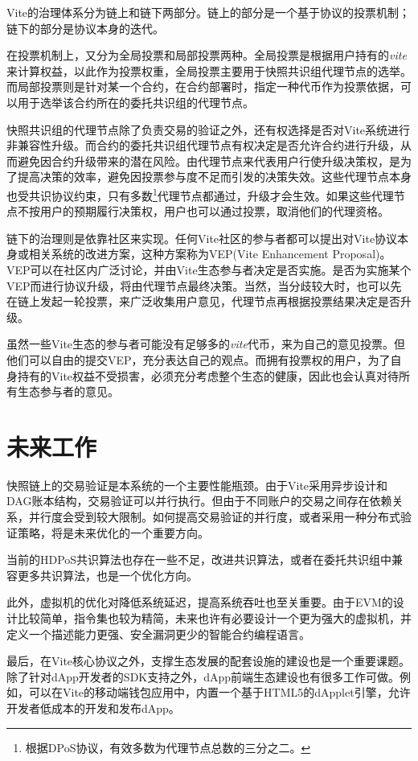 \documentclass[UTF8,nofonts]{ctexart}
\begin{document}
\begin{multicols}{2}
Vite的治理体系分为链上和链下两部分。链上的部分是一个基于协议的投票机制；链下的部分是协议本身的迭代。

在投票机制上，又分为全局投票和局部投票两种。全局投票是根据用户持有的\textit{vite}来计算权益，以此作为投票权重，全局投票主要用于快照共识组代理节点的选举。而局部投票则是针对某一个合约，在合约部署时，指定一种代币作为投票依据，可以用于选举该合约所在的委托共识组的代理节点。

快照共识组的代理节点除了负责交易的验证之外，还有权选择是否对Vite系统进行非兼容性升级。而合约的委托共识组代理节点有权决定是否允许合约进行升级，从而避免因合约升级带来的潜在风险。由代理节点来代表用户行使升级决策权，是为了提高决策的效率，避免因投票参与度不足而引发的决策失效。这些代理节点本身也受共识协议约束，只有多数\footnote{根据DPoS协议，有效多数为代理节点总数的三分之二。}代理节点都通过，升级才会生效。如果这些代理节点不按用户的预期履行决策权，用户也可以通过投票，取消他们的代理资格。

链下的治理则是依靠社区来实现。任何Vite社区的参与者都可以提出对Vite协议本身或相关系统的改进方案，这种方案称为VEP(Vite Enhancement Proposal)。VEP可以在社区内广泛讨论，并由Vite生态参与者决定是否实施。是否为实施某个VEP而进行协议升级，将由代理节点最终决策。当然，当分歧较大时，也可以先在链上发起一轮投票，来广泛收集用户意见，代理节点再根据投票结果决定是否升级。

虽然一些Vite生态的参与者可能没有足够多的\textit{vite}代币，来为自己的意见投票。但他们可以自由的提交VEP，充分表达自己的观点。而拥有投票权的用户，为了自身持有的Vite权益不受损害，必须充分考虑整个生态的健康，因此也会认真对待所有生态参与者的意见。

\section{未来工作}
快照链上的交易验证是本系统的一个主要性能瓶颈。由于Vite采用异步设计和DAG账本结构，交易验证可以并行执行。但由于不同账户的交易之间存在依赖关系，并行度会受到较大限制。如何提高交易验证的并行度，或者采用一种分布式验证策略，将是未来优化的一个重要方向。

当前的HDPoS共识算法也存在一些不足，改进共识算法，或者在委托共识组中兼容更多共识算法，也是一个优化方向。

此外，虚拟机的优化对降低系统延迟，提高系统吞吐也至关重要。由于EVM的设计比较简单，指令集也较为精简，未来也许有必要设计一个更为强大的虚拟机，并定义一个描述能力更强、安全漏洞更少的智能合约编程语言。

最后，在Vite核心协议之外，支撑生态发展的配套设施的建设也是一个重要课题。除了针对dApp开发者的SDK支持之外，dApp前端生态建设也有很多工作可做。例如，可以在Vite的移动端钱包应用中，内置一个基于HTML5的dApplet引擎，允许开发者低成本的开发和发布dApp。


\end{multicols}
\end{document}
